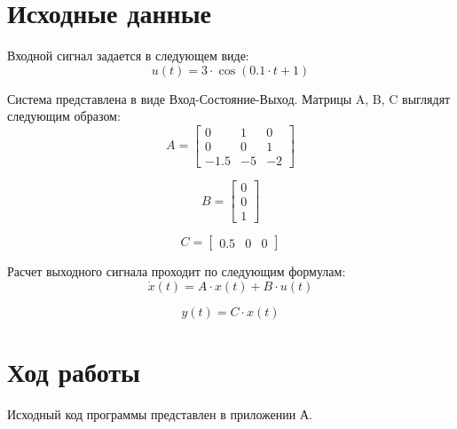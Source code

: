 \documentclass[14pt,a4paper]{extreport}
\begin{document}
\newpage
\chapter*{Исходные данные}

Входной сигнал задается в следующем виде:
\begin{equation}
    u(t) = 3 \cdot  \cos{(0.1 \cdot t + 1)}
\end{equation}

Система представлена в виде Вход-Состояние-Выход. Матрицы A, B, C выглядят следующим образом:
\begin{equation}
    A = 
    \begin{bmatrix} 
        0 & 1 & 0 \\ 
        0 & 0 & 1 \\
        -1.5 & -5 & -2
    \end{bmatrix}
\end{equation}

\begin{equation}
    B = 
    \begin{bmatrix} 
        0 \\
        0 \\
        1
    \end{bmatrix}
\end{equation}

\begin{equation}
    C = 
    \begin{bmatrix} 
        0.5 & 0 & 0
    \end{bmatrix}
\end{equation}

Расчет выходного сигнала проходит по следующим формулам:
\begin{equation}
\dot x(t) = A \cdot x(t) + B \cdot u(t)
\end{equation}

\begin{equation}
y(t) = C \cdot x(t)
\end{equation}

\chapter*{Ход работы}
Исходный код программы представлен в приложении А. 
\end{document}

